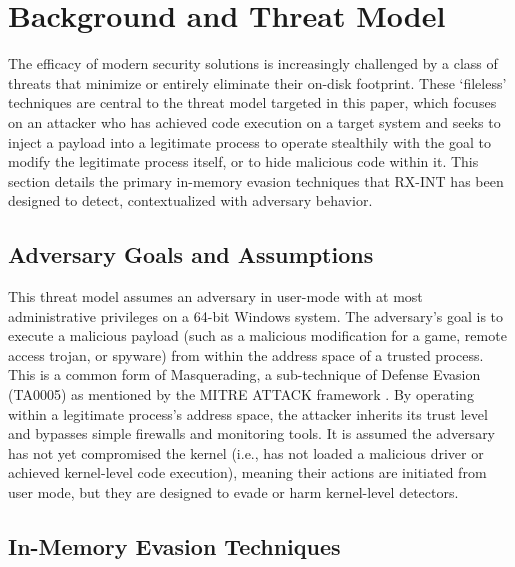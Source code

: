\documentclass[journal]{IEEEtran}
\begin{document}
\section{Background and Threat Model}\label{sec:background}
The efficacy of modern security solutions is increasingly challenged by a class of threats that minimize or entirely eliminate their on-disk footprint. These `fileless' techniques are central to the threat model targeted in this paper, which focuses on an attacker who has achieved code execution on a target system and seeks to inject a payload into a legitimate process to operate stealthily with the goal to modify the legitimate process itself, or to hide malicious code within it. This section details the primary in-memory evasion techniques that RX-INT has been designed to detect, contextualized with adversary behavior.
\subsection{Adversary Goals and Assumptions}
This threat model assumes an adversary in user-mode with at most administrative privileges on a 64-bit Windows system. The adversary's goal is to execute a malicious payload (such as a malicious modification for a game, remote access trojan, or spyware) from within the address space of a trusted process. This is a common form of Masquerading, a sub-technique of Defense Evasion (TA0005) as mentioned by the MITRE ATTACK framework \cite{MITRE_ATTACK_DEFENSE_EVASION}. By operating within a legitimate process's address space, the attacker inherits its trust level and bypasses simple firewalls and monitoring tools. It is assumed the adversary has not yet compromised the kernel (i.e., has not loaded a malicious driver or achieved kernel-level code execution), meaning their actions are initiated from user mode, but they are designed to evade or harm kernel-level detectors.
\subsection{In-Memory Evasion Techniques}
\end{document}
